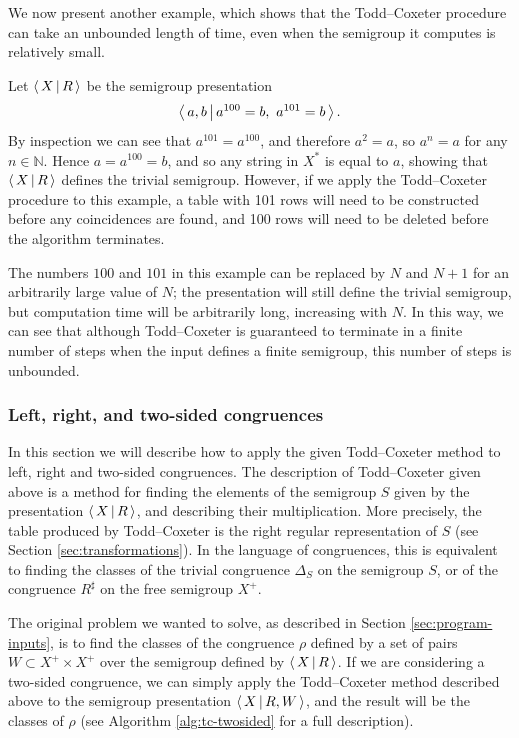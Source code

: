 We now present another example, which shows that the Todd--Coxeter procedure can
take an unbounded length of time, even when the semigroup it computes is
relatively small.

\begin{example}
  \label{ex:tc-long}
  Let $\left\langle\,X\,\middle|\,R\,\right\rangle$ be the semigroup presentation
  $$\left\langle\,a,b\,\middle|\,a^{100}=b,\ a^{101}=b\,\right\rangle.$$
  By inspection we can see that $a^{101}=a^{100}$, and therefore $a^2=a$, so
  $a^n = a$ for any $n \in \mathbb{N}$.  Hence $a=a^{100}=b$, and so any string
  in $X^*$ is equal to $a$, showing that $\left\langle\,X\,\middle|\,R\,\right\rangle$ defines the trivial
  semigroup.  However, if we apply the Todd--Coxeter procedure to this example,
  a table with 101 rows will need to be constructed before any coincidences are
  found, and 100 rows will need to be deleted before the algorithm terminates.

  The numbers $100$ and $101$ in this example can be replaced by $N$ and $N+1$
  for an arbitrarily large value of $N$; the presentation will still define the
  trivial semigroup, but computation time will be arbitrarily long, increasing
  with $N$.  In this way, we can see that although Todd--Coxeter is guaranteed
  to terminate in a finite number of steps when the input defines a finite
  semigroup, this number of steps is unbounded.
\end{example}

\subsubsection{Left, right, and two-sided congruences}
\label{sec:tc-l-r}
In this section we will describe how to apply the given Todd--Coxeter method to
left, right and two-sided congruences.  The description of Todd--Coxeter given
above is a method for finding the elements of the semigroup $S$ given by the
presentation $\left\langle\,X\,\middle|\,R\,\right\rangle$, and describing their multiplication.  More
precisely, the table produced by Todd--Coxeter is the right regular
representation of $S$ (see Section \ref{sec:transformations}).  In the language
of congruences, this is equivalent to finding the classes of the trivial
congruence $\Delta_S$ on the semigroup $S$, or of the congruence $R^\sharp$ on
the free semigroup $X^+$.

The original problem we wanted to solve, as described in Section
\ref{sec:program-inputs}, is to find the classes of the congruence $\rho$
defined by a set of pairs $W \subset X^+ \times X^+$ over the semigroup defined
by $\left\langle\,X\,\middle|\,R\,\right\rangle$.  If we are considering
a two-sided congruence, we can simply apply the Todd--Coxeter method described
above to the semigroup presentation $\left\langle\,X\,\middle|\,R,W\,\right\rangle$, and the result will be the
classes of $\rho$ (see Algorithm \ref{alg:tc-twosided} for a full description).

